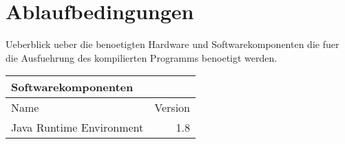 \section{Ablaufbedingungen}
Ueberblick ueber die benoetigten Hardware und Softwarekomponenten die fuer die Ausfuehrung des kompilierten Programms benoetigt werden. 

\begin{table}[h!]
	\begin{tabular}{lr} 
	\toprule
	Softwarekomponenten\\  
	\midrule 
	Name & Version\\ 
	\midrule 
	Java Runtime Environment & 1.8\\ 
	\bottomrule
	\end{tabular}
	\label{tab:ablaufbedingungen}
\end{table}



